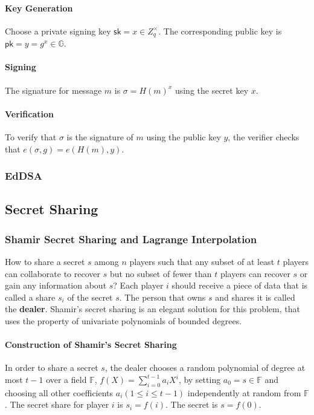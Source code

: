 \paragraph{Key Generation} Choose a private signing key $\mathsf{sk}=x\in Z_q^\times$. The corresponding public key is $\mathsf{pk}=y=g^x \in \mathbb{G}$. 

\paragraph{Signing} The signature for message $m$ is $\sigma=H(m)^x$ using the secret key $x$.  
\paragraph{Verification} To verify that $\sigma$ is the signature of $m$ using the public key $y$, the verifier checks that $e(\sigma, g) = e(H(m), y)$. 

\subsubsection{EdDSA}

\subsection{Secret Sharing}
\subsubsection{Shamir Secret Sharing and Lagrange Interpolation}
How to share a secret $s$ among $n$ players such that any subset of at least $t$ players can collaborate to recover $s$ but no subset of fewer than $t$ players can recover $s$ or gain any information about $s$? Each player $i$ should receive a piece of data that is called a share $s_i$ of the secret $s$. The person that owns $s$ and shares it is called the \textbf{dealer}. Shamir's secret sharing is an elegant solution for this problem, that uses the property of univariate polynomials of bounded degrees. 

\paragraph{Construction of Shamir's Secret Sharing} In order to share a secret $s$, the dealer chooses a random polynomial of degree at most $t-1$ over a field $\mathbb{F}$, $f(X)=\sum_{i=0}^{t-1} a_i X^i$, by setting $a_0=s\in \mathbb{F}$ and choosing all other coefficients $a_i(1\le i\le t-1)$ independently at random from $\mathbb{F}$. The secret share for player $i$ is $s_i = f(i)$. The secret is $s=f(0)$. 


